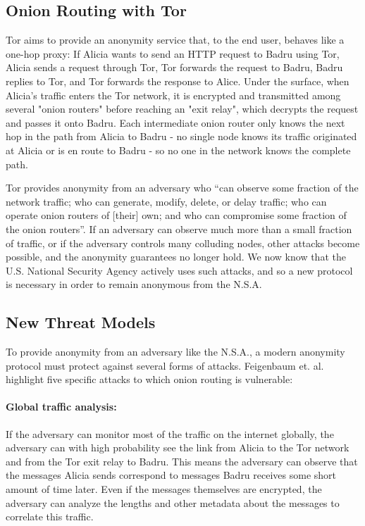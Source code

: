   \subsection{Onion Routing with Tor}
  \label{Subsubsection:Tor}
    Tor aims to provide an anonymity service that, to the end user, behaves like
    a one-hop proxy: If Alicia wants to send an HTTP request to Badru using Tor,
    Alicia sends a request through Tor, Tor forwards the request to Badru, Badru
    replies to Tor, and Tor forwards the response to Alice. Under the surface,
    when Alicia's traffic enters the Tor network, it is encrypted and
    transmitted among several "onion routers" before reaching an "exit relay",
    which decrypts the request and passes it onto Badru. Each intermediate onion
    router only knows the next hop in the path from Alicia to Badru - no single
    node knows its traffic originated at Alicia or is en route to Badru - so no
    one in the network knows the complete path.

    Tor provides anonymity from an adversary who ``can observe some fraction of
    the network traffic; who can generate, modify, delete, or delay traffic; who
    can operate onion routers of [their] own; and who can compromise some
    fraction of the onion routers''\cite{dingledine_tor:_2004}. If an adversary
    can observe much more than a small fraction of traffic, or if the adversary
    controls many colluding nodes, other attacks become possible, and the
    anonymity guarantees no longer hold. We now know that the U.S. National
    Security Agency actively uses such attacks, and so a new protocol is
    necessary in order to remain anonymous from the N.S.A.

  \subsection{New Threat Models}
  \label{Subsubsection:NewThreats} To
    provide anonymity from an adversary like the N.S.A., a modern anonymity
    protocol must protect against several forms of attacks. Feigenbaum et.
    al.\cite{feigenbaum_seeking_2013} highlight five specific attacks to which
    onion routing is vulnerable:
    \paragraph{Global traffic analysis:} If the
    adversary can monitor most of the traffic on the internet globally, the
    adversary can with high probability see the link from Alicia to the Tor
    network and from the Tor exit relay to Badru. This means the adversary can
    observe that the messages Alicia sends correspond to messages Badru receives
    some short amount of time later. Even if the messages themselves are
    encrypted, the adversary can analyze the lengths and other metadata about
    the messages to correlate this traffic.
